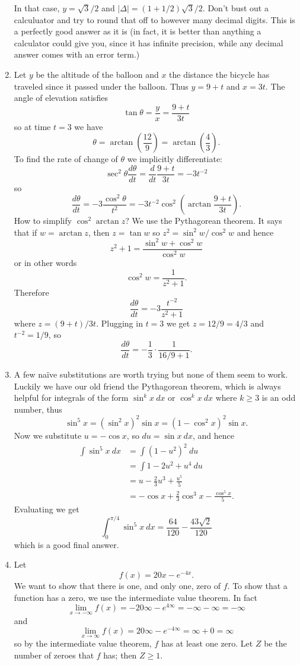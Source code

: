 \documentclass[reqno,12pt,letterpaper]{amsart}
\theoremstyle{definition}
\numberwithin{equation}{section}
\begin{document}
\begin{enumerate}
In that case, $y = \sqrt 3/2$ and $|\Delta| = (1 + 1/2)\sqrt 3/2$.
Don't bust out a calculuator and try to round that off to however many decimal digits.
This is a perfectly good answer as it is (in fact, it is better than anything a calculator could give you, since it has infinite precision, while any decimal answer comes with an error term.)
\item Let $y$ be the altitude of the balloon and $x$ the distance the bicycle has traveled since it passed under the balloon.
Thus $y = 9 + t$ and $x = 3t$. The angle of elevation satisfies
$$\tan \theta = \frac{y}{x} = \frac{9 + t}{3t}$$
so at time $t = 3$ we have
$$\theta = \arctan\left(\frac{12}{9}\right) = \arctan\left(\frac{4}{3}\right).$$
To find the rate of change of $\theta$ we implicitly differentiate:
$$\sec^2 \theta \frac{d\theta}{dt} = \frac{d}{dt} \frac{9 + t}{3t} = -3t^{-2}$$
so
$$\frac{d\theta}{dt} = -3\frac{\cos^2 \theta}{t^2} = -3t^{-2} \cos^2\left(\arctan\frac{9 + t}{3t}\right).$$
How to simplify $\cos^2 \arctan z$? We use the Pythagorean theorem.
It says that if $w = \arctan z$, then $z = \tan w$ so $z^2 = \sin^2 w/\cos^2 w$ and hence
$$z^2 + 1 = \frac{\sin^2 w + \cos^2 w}{\cos^2 w}$$
or in other words
$$\cos^2 w = \frac{1}{z^2 + 1}.$$
Therefore
$$\frac{d\theta}{dt} = -3\frac{t^{-2}}{z^2 + 1}$$
where $z = (9 + t)/3t$. Plugging in $t = 3$ we get $z = 12/9 = 4/3$ and $t^{-2} = 1/9$, so
$$\frac{d\theta}{dt} = -\frac{1}{3} \cdot \frac{1}{16/9 + 1}.$$
\item A few na\"ive substitutions are worth trying but none of them seem to work.
Luckily we have our old friend the Pythagorean theorem, which is always helpful for integrals of the form $\sin^k x ~dx$ or $\cos^k x ~dx$ where $k \geq 3$ is an odd number, thus
$$\sin^5 x = (\sin^2 x)^2 \sin x = (1 - \cos^2 x)^2 \sin x.$$
Now we substitute $u = -\cos x$, so $du = \sin x ~dx$, and hence
\begin{align*}\int \sin^5 x ~dx &= \int (1 - u^2)^2 ~du \\
&= \int 1 - 2u^2 + u^4 ~du \\
&= u - \frac{2}{3}u^3 + \frac{u^5}{5} \\
&= -\cos x + \frac{2}{3} \cos^3 x - \frac{\cos^5 x}{5}.
\end{align*}
Evaluating we get
$$\int_0^{\pi/4} \sin^5 x ~dx = \frac{64}{120} - \frac{43\sqrt 2}{120}$$
which is a good final answer.
\item Let
$$f(x) = 20x - e^{-4x}.$$
We want to show that there is one, and only one, zero of $f$.
To show that a function has a zero, we use the intermediate value theorem.
In fact
$$\lim_{x \to -\infty} f(x) = -20\infty - e^{4\infty} = -\infty - \infty = -\infty$$
and
$$\lim_{x \to \infty} f(x) = 20\infty - e^{-4\infty} = \infty + 0 = \infty$$
so by the intermediate value theorem, $f$ has at least one zero.
Let $Z$ be the number of zeroes that $f$ has; then $Z \geq 1$.


\end{enumerate}
\end{document}
